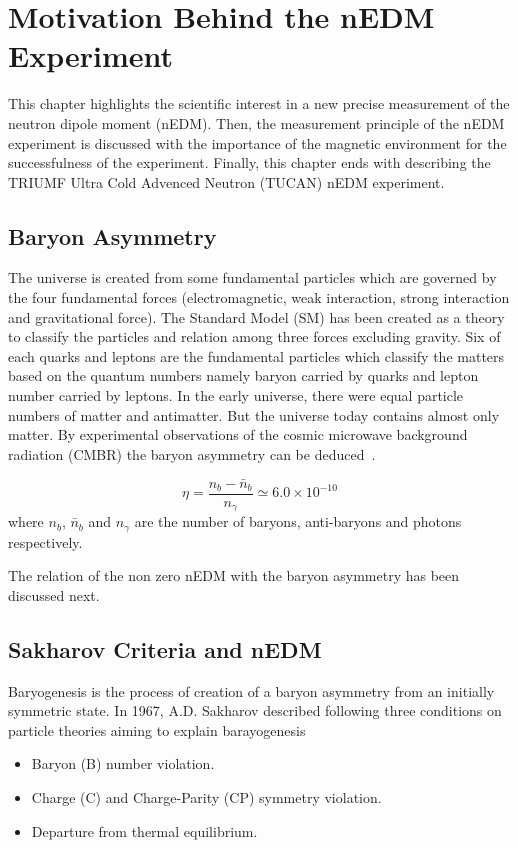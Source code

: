 \chapter{Motivation Behind the nEDM Experiment}
\label{ch:motivation} 
This chapter highlights the scientific interest in a new precise measurement of the neutron dipole moment (nEDM). Then, the measurement principle of the nEDM experiment is discussed with the importance of the magnetic environment for the successfulness of the experiment. Finally, this chapter ends with describing the TRIUMF Ultra Cold Advenced Neutron (TUCAN) nEDM experiment.

\section{Baryon Asymmetry}
The universe is created from some fundamental particles which are governed by the four fundamental forces (electromagnetic, weak interaction, strong interaction and gravitational force). The Standard Model (SM) has been created as a theory to classify the particles and relation among three forces excluding gravity. Six of each quarks and leptons are the fundamental particles which classify the matters based on the quantum numbers namely baryon carried by quarks and lepton number carried by leptons. In the early universe, there were equal particle numbers of matter and antimatter. But the universe today contains almost only matter. By experimental observations of the cosmic microwave background radiation (CMBR) the baryon asymmetry can be deduced~\cite{expBar}.

\begin{equation}\label{eq:baryons}
    \eta =\frac{n_b-\bar{n}_b}{n_\gamma}\simeq6.0 \times 10^{-10}
\end{equation}
where $n_b$, $\bar{n}_b$ and ${n_\gamma}$ are the number of baryons, anti-baryons and photons respectively. 


The relation of the non zero nEDM with the baryon asymmetry has been discussed next.

\section{Sakharov Criteria and nEDM}
Baryogenesis is the process of creation of a baryon asymmetry from an initially symmetric state. In 1967, A.D. Sakharov described following three conditions on particle theories aiming to explain barayogenesis~\cite{Sakharov:1967dj}
\begin{itemize}
    \item Baryon (B) number violation.
    \item Charge (C) and Charge-Parity (CP) symmetry violation.
    \item Departure from thermal equilibrium.
\end{itemize}


